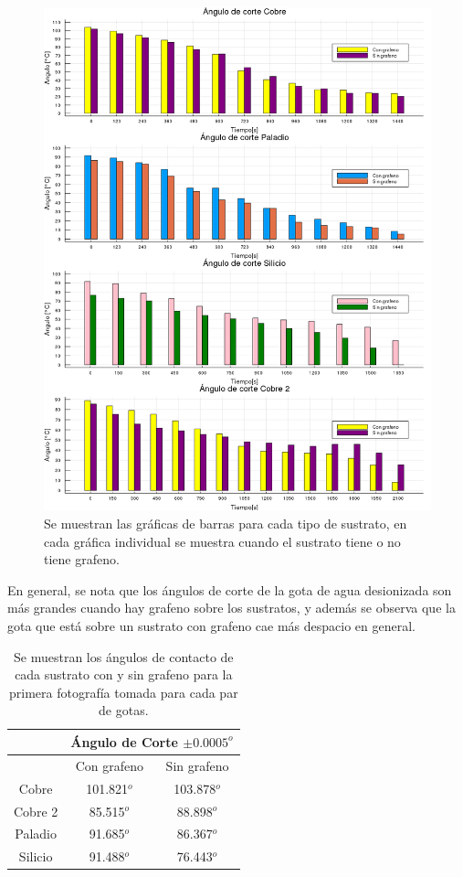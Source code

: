 \documentclass[twocolumn,letterpaper,aps,pra,10pt]{revtex4-1}
\begin{document}
\begin{figure}[h]
\centering
\includegraphics[scale=0.2]{Angulo_Corte_Todas.png}
\caption{Se muestran las gráficas de barras para cada tipo de sustrato, en cada gráfica individual se muestra cuando el sustrato tiene o no tiene grafeno.}
\end{figure}

En general, se nota que los ángulos de corte de la gota de agua desionizada son más grandes cuando hay grafeno sobre los sustratos, y además se observa que la gota que está sobre un sustrato con grafeno cae más despacio en general.

\begin{table}[h]
\begin{tabular}{|c|c|c|}
\hline 
 & \multicolumn{2}{c|}{Ángulo de Corte $\pm 0.0005^{o}$} \\ 
\hline 
 & Con grafeno & Sin grafeno \\ 
\hline 
\hline
Cobre & 101.821$^{o}$ & 103.878$^{o}$ \\ 
\hline 
Cobre 2 & 85.515$^{o}$ & 88.898$^{o}$ \\ 
\hline 
Paladio & 91.685$^{o}$ & 86.367$^{o}$ \\ 
\hline 
Silicio & 91.488$^{o}$ & 76.443$^{o}$ \\ 
\hline 
\end{tabular} 
\caption{Se muestran los ángulos de contacto de cada sustrato con y sin grafeno para la primera fotografía tomada para cada par de gotas.}
\end{table}
\end{document}
